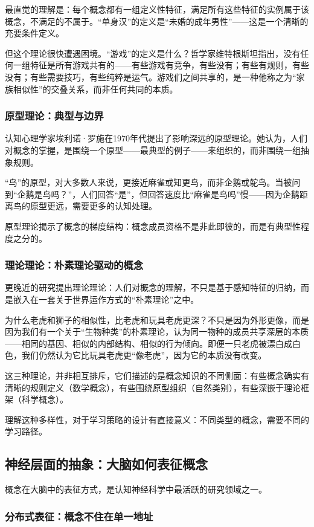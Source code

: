 \documentclass[11pt]{article}
\begin{document}
最直觉的理解是：每个概念都有一组定义性特征，满足所有这些特征的实例属于该概念，不满足的不属于。“单身汉”的定义是“未婚的成年男性”——这是一个清晰的充要条件定义。

但这个理论很快遭遇困境。“游戏”的定义是什么？哲学家维特根斯坦指出，没有任何一组特征是所有游戏共有的——有些游戏有竞争，有些没有；有些有规则，有些没有；有些需要技巧，有些纯粹是运气。游戏们之间共享的，是一种他称之为“家族相似性”的交叠关系，而非任何共同的本质。
\subsubsection{原型理论：典型与边界}
\label{sec:org6fec996}

认知心理学家埃利诺·罗施在1970年代提出了影响深远的原型理论。她认为，人们对概念的掌握，是围绕一个原型——最典型的例子——来组织的，而非围绕一组抽象规则。

“鸟”的原型，对大多数人来说，更接近麻雀或知更鸟，而非企鹅或鸵鸟。当被问到“企鹅是鸟吗？”，人们回答“是”，但回答速度比“麻雀是鸟吗”慢——因为企鹅距离鸟的原型更远，需要更多的认知处理。

原型理论揭示了概念的梯度结构：概念成员资格不是非此即彼的，而是有典型性程度之分的。
\subsubsection{理论理论：朴素理论驱动的概念}
\label{sec:orgcfc1c0c}

更晚近的研究提出理论理论：人们对概念的理解，不只是基于感知特征的归纳，而是嵌入在一套关于世界运作方式的“朴素理论”之中。

为什么老虎和狮子的相似性，比老虎和玩具老虎更深？不只是因为外形更像，而是因为我们有一个关于“生物种类”的朴素理论，认为同一物种的成员共享深层的本质——相同的基因、相似的内部结构、相似的行为倾向。即便一只老虎被漂白成白色，我们仍然认为它比玩具老虎更“像老虎”，因为它的本质没有改变。

这三种理论，并非相互排斥，它们描述的是概念知识的不同侧面：有些概念确实有清晰的规则定义（数学概念），有些围绕原型组织（自然类别），有些深嵌于理论框架（科学概念）。

理解这种多样性，对于学习策略的设计有直接意义：不同类型的概念，需要不同的学习路径。
\subsection{神经层面的抽象：大脑如何表征概念}
\label{sec:orga50e3ea}

概念在大脑中的表征方式，是认知神经科学中最活跃的研究领域之一。
\subsubsection{分布式表征：概念不住在单一地址}
\label{sec:org538e049}
\end{document}
